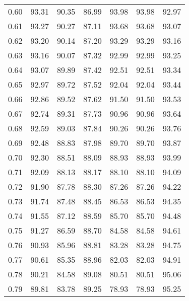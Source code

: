 \begin{tabular}{|c|c|c|c|c|c|c|}
      0.60 &     93.31 &     90.35 &      86.99 &   93.98 &      93.98 &         92.97 \\
      0.61 &     93.27 &     90.27 &      87.11 &   93.68 &      93.68 &         93.07 \\
      0.62 &     93.20 &     90.14 &      87.20 &   93.29 &      93.29 &         93.16 \\
      0.63 &     93.16 &     90.07 &      87.32 &   92.99 &      92.99 &         93.25 \\
      0.64 &     93.07 &     89.89 &      87.42 &   92.51 &      92.51 &         93.34 \\
      0.65 &     92.97 &     89.72 &      87.52 &   92.04 &      92.04 &         93.44 \\
      0.66 &     92.86 &     89.52 &      87.62 &   91.50 &      91.50 &         93.53 \\
      0.67 &     92.74 &     89.31 &      87.73 &   90.96 &      90.96 &         93.64 \\
      0.68 &     92.59 &     89.03 &      87.84 &   90.26 &      90.26 &         93.76 \\
      0.69 &     92.48 &     88.83 &      87.98 &   89.70 &      89.70 &         93.87 \\
      0.70 &     92.30 &     88.51 &      88.09 &   88.93 &      88.93 &         93.99 \\
      0.71 &     92.09 &     88.13 &      88.17 &   88.10 &      88.10 &         94.09 \\
      0.72 &     91.90 &     87.78 &      88.30 &   87.26 &      87.26 &         94.22 \\
      0.73 &     91.74 &     87.48 &      88.45 &   86.53 &      86.53 &         94.35 \\
      0.74 &     91.55 &     87.12 &      88.59 &   85.70 &      85.70 &         94.48 \\
      0.75 &     91.27 &     86.59 &      88.70 &   84.58 &      84.58 &         94.61 \\
      0.76 &     90.93 &     85.96 &      88.81 &   83.28 &      83.28 &         94.75 \\
      0.77 &     90.61 &     85.35 &      88.96 &   82.03 &      82.03 &         94.91 \\
      0.78 &     90.21 &     84.58 &      89.08 &   80.51 &      80.51 &         95.06 \\
      0.79 &     89.81 &     83.78 &      89.25 &   78.93 &      78.93 &         95.25 \\

\end{tabular}
